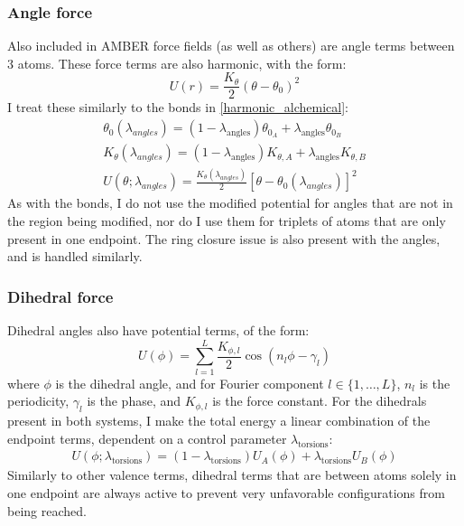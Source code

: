 \subsubsection{Angle force}
%
Also included in AMBER force fields (as well as others) are angle terms between 3 atoms.
%
These force terms are also harmonic, with the form:
%
\begin{equation} \label{eq:angleforce}
    U(r) = \frac{K_{\theta}}{2}(\theta - \theta_0)^2
\end{equation}
%
I treat these similarly to the bonds in \ref{harmonic_alchemical}:
%
\begin{eqnarray} \label{harmonic_alchemical_angles}
    \theta_0 (\lambda_{angles}) = (1 - \lambda_\mathrm{angles}) \theta_{0_A} + \lambda_\mathrm{angles} \theta_{0_B} \\
    K_\theta (\lambda_{angles}) = (1 - \lambda_\mathrm{angles}) K_{\theta,A} + \lambda_\mathrm{angles} K_{\theta,B} \\
    U(\theta; \lambda_{angles}) = \frac{K_\theta (\lambda_{angles})} {2}\left[\theta - \theta_0(\lambda_{angles})\right]^2
\end{eqnarray}
%
As with the bonds, I do not use the modified potential for angles that are not in the region being modified, nor do I use them for triplets of atoms that are only present in one endpoint.
%
The ring closure issue is also present with the angles, and is handled similarly.
%
\subsubsection{Dihedral force}
%
Dihedral angles also have potential terms, of the form:
%
\begin{equation}
    U(\phi) = \sum_{l=1}^L \frac{K_{\phi,l}}{2} \cos(n_l \phi - \gamma_l)
\end{equation}
%
\noindent where $\phi$ is the dihedral angle, and for Fourier component $l \in \{1, \ldots, L\}$, $n_l$ is the periodicity, $\gamma_l$ is the phase, and $K_{\phi,l}$ is the force constant.
%
For the dihedrals present in both systems, I make the total energy a linear combination of the endpoint terms, dependent on a control parameter $\lambda_\mathrm{torsions}$:
%
\begin{eqnarray}
    U(\phi; \lambda_\mathrm{torsions}) = (1 - \lambda_\mathrm{torsions}) U_A(\phi) + \lambda_\mathrm{torsions} U_B(\phi)
\end{eqnarray}
%
Similarly to other valence terms, dihedral terms that are between atoms solely in one endpoint are always active to prevent very unfavorable configurations from being reached.
%
